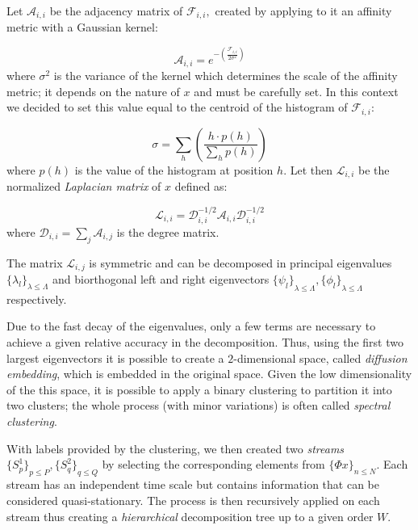 \documentclass[twoside]{article}
\begin{document}
Let $\mathcal{A}_{i,i}$ be the adjacency matrix of $\mathcal{F}_{i, i},$ created by applying to it an affinity metric with a Gaussian kernel:

\begin{equation}
  \label{eq:adjacency}
\mathcal{A}_{i,i} = e^{- \left( \frac{\mathcal{F}_{i,i}}{2 \sigma ^2} \right) }
\end{equation}
where $\sigma^2$ is the variance of the kernel which determines the scale of the affinity metric; it depends on the nature of $x$ and must be carefully set. 
In this context we decided to set this value equal to the centroid of the histogram of  $\mathcal{F}_{i, i}$:

\begin{equation}
  \label{eq:variance}
  \sigma = \sum_{h} {\left(\frac{h \cdot p(h)}{\sum_{h} p(h)}\right)}
\end{equation}
where $p(h)$ is the value of the histogram at position $h$. Let then $\mathcal{L}_{i,i}$ be the normalized \emph{Laplacian matrix} of $x$ defined as:

\begin{equation}
  \label{eq:norm_laplace}
   \mathcal{L}_{i,i} = \mathcal{D}_{i,i}^{-1/2}  \mathcal{A}_{i,i}  \mathcal{D}_{i,i}^{-1/2}
\end{equation}
where $\mathcal{D}_{i,i} = \sum_j {\mathcal{A}_{i, j}}$ is the degree matrix.

The matrix $\mathcal{L}_{i,j}$ is symmetric and can be decomposed in principal eigenvalues ${\{\lambda _l\}}_{\lambda \leq \Lambda}$ 
and biorthogonal left and right eigenvectors ${\{\psi _l\}}_{\lambda \leq \Lambda}, {\{\phi _l\}}_{\lambda \leq \Lambda}$ respectively.

Due to the fast decay of the eigenvalues, only a few terms are necessary to achieve a given relative accuracy in the decomposition.
Thus, using the first two largest eigenvectors it is possible to create a $2$-dimensional space, called \emph{diffusion embedding},
which is embedded in the original space.
Given the low dimensionality of the this space, it is possible to apply a binary clustering to partition it into two clusters;
the whole process (with minor variations) is often called \emph{spectral clustering}. 

With labels provided by the clustering, we then created two \emph{streams} ${\{S^1_p\}}_{p \leq P}, {\{S^2_q\}}_{q \leq Q}$ by selecting the 
corresponding elements from ${\{\Phi x\}}_{n \leq N}$. Each stream has an independent time scale but contains information that can be considered quasi-stationary. The process is then recursively applied on
each stream thus creating a \emph{hierarchical} decomposition tree up to a given order $W$. 
\end{document}
